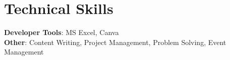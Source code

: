 \documentclass[letterpaper,11pt]{article}
\begin{document}
\section{Technical Skills}
 \begin{itemize}[leftmargin=0.15in, label={}]
    \small{\item{
     \textbf{Developer Tools}: MS Excel, Canva \\
     \textbf{Other}: Content Writing, Project Management, Problem Solving, Event Management
    }}
 \end{itemize}

\end{document}
